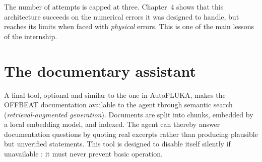 The number of attempts is capped at three. Chapter~4 shows that this
architecture succeeds on the numerical errors it was designed to handle, but
reaches its limits when faced with \textit{physical} errors. This is one of the
main lessons of the internship.

\section{The documentary assistant}

A final tool, optional and similar to the one in AutoFLUKA, makes the OFFBEAT
documentation available to the agent through semantic search
(\textit{retrieval-augmented generation}). Documents are split into chunks,
embedded by a local embedding model, and indexed. The agent can thereby answer
documentation questions by quoting real excerpts rather than producing plausible
but unverified statements. This tool is designed to disable itself silently if
unavailable : it must never prevent basic operation.

\clearpage
